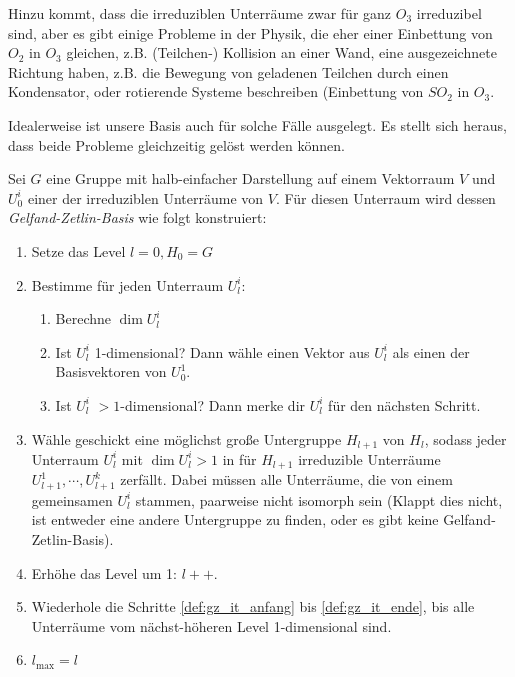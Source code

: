 \begin{remark}
	\label{rem:einbettung_in_physik}
 Hinzu kommt, dass die irreduziblen Unterräume zwar für ganz $O_3$ irreduzibel sind, aber es gibt einige Probleme in der Physik, die eher einer Einbettung von $O_2$ in $O_3$ gleichen, z.B. (Teilchen-) Kollision an einer Wand, eine ausgezeichnete Richtung haben, z.B. die Bewegung von geladenen Teilchen durch einen Kondensator, oder rotierende Systeme beschreiben (Einbettung von $SO_2$ in $O_3$.
\end{remark}

 \begin{remark}
 	Idealerweise ist unsere Basis auch für solche Fälle ausgelegt. Es stellt sich heraus, dass beide Probleme gleichzeitig gelöst werden können.
 \end{remark}
 \begin{definition}
 	\label{def:konstruktion_gz_basis}
	Sei $G$ eine Gruppe mit halb-einfacher Darstellung auf einem Vektorraum $V$ und $U^i_0$ einer der irreduziblen Unterräume von $V$. Für diesen Unterraum wird dessen \emph{Gelfand-Zetlin-Basis} wie folgt konstruiert:
	\begin{enumerate}[label={\arabic*.)}]
		\item Setze das Level $l=0, H_0 = G$
		\item Bestimme für jeden Unterraum $U_l^i$: \label{def:gz_it_anfang}
		\begin{enumerate}
			\item Berechne $\dim{U_l^i}$
			\item Ist $U_l^i$ 1-dimensional? Dann wähle einen Vektor aus $U_l^i$ als einen der Basisvektoren von $U^1_0$.
			\item Ist $U_l^i$ $>1$-dimensional? Dann merke dir $U_l^i$ für den nächsten Schritt.
		\end{enumerate}
		\item Wähle geschickt eine möglichst große Untergruppe $H_{l+1}$ von $H_{l}$, sodass jeder Unterraum $U_l^i$ mit $\dim{U_l^i}>1$ in für $H_{l+1}$ irreduzible Unterräume $U_{l+1}^{1}, \cdots, U_{l+1}^{k}$ zerfällt. Dabei müssen alle Unterräume, die von einem gemeinsamen $U_l^i$ stammen, paarweise nicht isomorph sein (Klappt dies nicht, ist entweder eine andere Untergruppe zu finden, oder es gibt keine Gelfand-Zetlin-Basis). \label{def:gz_it_ugschritt}
		\item Erhöhe das Level um 1: $l++$. \label{def:gz_it_ende}
		\item Wiederhole die Schritte \ref{def:gz_it_anfang} bis \ref{def:gz_it_ende}, bis alle Unterräume vom nächst-höheren Level 1-dimensional sind.
		\item $l_{\text{max}} = l$
		\end{enumerate}
\end{definition}
